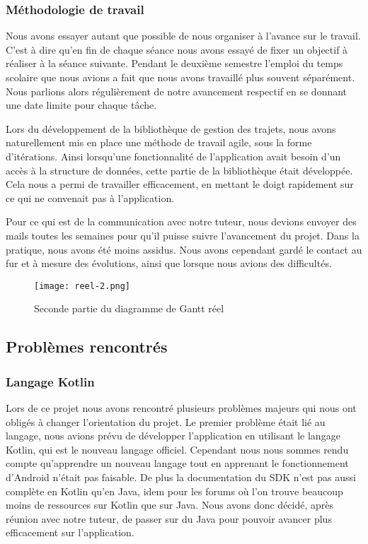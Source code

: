 \subsubsection{Méthodologie de travail}
Nous avons essayer autant que possible de nous organiser à l'avance sur le travail. C'est à dire qu'en fin de chaque séance nous avons essayé de fixer un objectif à réaliser à la séance suivante.
Pendant le deuxième semestre l'emploi du temps scolaire que nous avions a fait que nous avons travaillé plus souvent séparément. Nous parlions alors régulièrement de notre avancement respectif en se donnant une date limite pour chaque tâche.
\par
Lors du développement de la bibliothèque de gestion des trajets, nous avons naturellement mis en place une méthode de travail agile, sous la forme d'itérations. Ainsi lorsqu'une fonctionnalité de l'application avait besoin d'un accès à la structure de données, cette partie de la bibliothèque était développée.
Cela nous a permi de travailler efficacement, en mettant le doigt rapidement sur ce qui ne convenait pas à l'application.
\par
Pour ce qui est de la communication avec notre tuteur, nous devions envoyer des mails toutes les semaines pour qu'il puisse suivre l'avancement du projet. Dans la pratique, nous avons été moins assidus. Nous avons cependant gardé le contact au fur et à mesure des évolutions, ainsi que lorsque nous avions des difficultés.
\vfill
\begin{figure}[!h]
    \begin{center}
        \texttt{[image: reel-2.png]}
        \caption{Seconde partie du diagramme de Gantt réel}
    \end{center}
\end{figure}
\newpage




\subsection{Problèmes rencontrés}
\subsubsection{Langage Kotlin}
Lors de ce projet nous avons rencontré plusieurs problèmes majeurs qui nous ont obligés à changer l'orientation du projet.
Le premier problème était lié au langage, nous avions prévu de développer l'application en utilisant le langage Kotlin, qui est le nouveau langage officiel.
Cependant nous nous sommes rendu compte qu'apprendre un nouveau langage tout en apprenant le fonctionnement d'Android n'était pas faisable.
De plus la documentation du SDK n'est pas aussi complète en Kotlin qu'en Java, idem pour les forums où l'on trouve beaucoup moins de ressources sur Kotlin que sur Java.
Nous avons donc décidé, après réunion avec notre tuteur, de passer sur du Java pour pouvoir avancer plus efficacement sur l'application.
